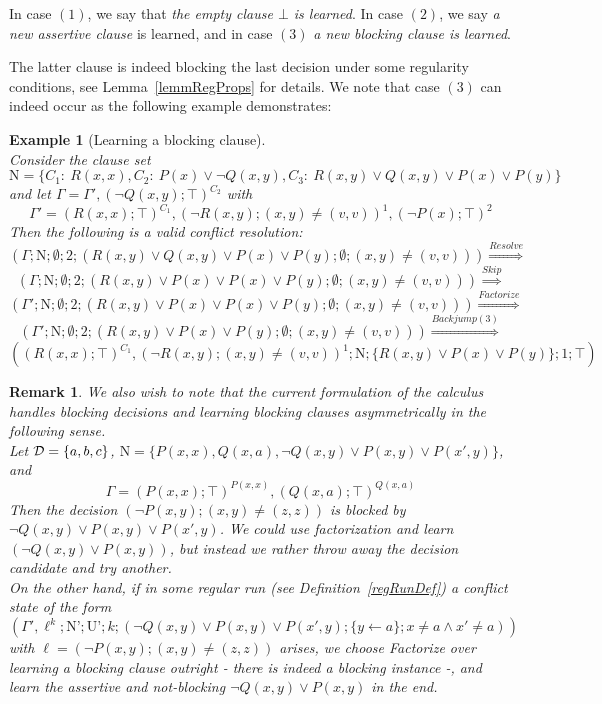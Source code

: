 \documentclass[a4paper]{article}
\newcommand{\leaveabit}{\\[6 pt]}
\newtheorem{remark}[defi]{Remark}
\newtheorem{example}[defi]{Example}
\newcommand\exClauseNo[1]{C_{#1}} \newcommand{\rst}[1]{|_{#1}}
\begin{document}
In case $(1)$, we say that \emph{the empty clause $\bot$ is learned}. 
In case $(2)$, we say \emph{a new assertive clause} is learned, and in case $(3)$ \emph{a new blocking clause is learned}.

The latter clause is indeed blocking the last decision under some regularity conditions, see Lemma~\ref{lemmRegProps} for details.
We note that case $(3)$ can indeed occur as the following example demonstrates:

\begin{example}[Learning a blocking clause]\emph{~}\leaveabit
\noindent
Consider the clause set
\[\text{N} = \{ 
		\exClauseNo{1}:~R(x,x), 
		\exClauseNo{2}:~P(x) \lor \neg Q(x,y),
		\exClauseNo{3}:~R(x,y) \lor Q(x,y) \lor P(x) \lor P(y)
\}\]
and let $\Gamma = \Gamma', (\neg Q(x,y); \top)^{\exClauseNo{2}}$ with
\[\Gamma' = (R(x,x); \top)^{\exClauseNo{1}}, (\neg R(x,y); (x,y) \ne (v,v))^1, (\neg P(x); \top)^2\]
Then the following is a valid conflict resolution:
\[
(\Gamma; \text{N}; \emptyset; 2; (R(x,y) \lor Q(x,y) \lor P(x) \lor P(y); \emptyset; (x,y) \ne (v,v)))
\stackrel{Resolve}{\Rightarrow}
\]
\[
(\Gamma; \text{N}; \emptyset; 2; (R(x,y) \lor P(x) \lor P(x) \lor P(y); \emptyset; (x,y) \ne (v,v)))
\stackrel{Skip}{\Rightarrow}
\]
\[
(\Gamma'; \text{N}; \emptyset; 2; (R(x,y) \lor P(x) \lor P(x) \lor P(y); \emptyset; (x,y) \ne (v,v)))
\stackrel{Factorize}{\Rightarrow}
\]
\[
(\Gamma'; \text{N}; \emptyset; 2; (R(x,y) \lor P(x) \lor P(y); \emptyset; (x,y) \ne (v,v)))
\stackrel{Backjump(3)}{\Rightarrow}
\]
\[
((R(x,x); \top)^{\exClauseNo{1}}, (\neg R(x,y); (x,y) \ne (v,v))^1; \text{N}; \{R(x,y) \lor P(x) \lor P(y)\}; 1; \top)
\]
\end{example}

\begin{remark} We also wish to note that the current formulation of the calculus handles 
blocking decisions and learning blocking clauses asymmetrically in the following sense.\leaveabit
Let $\mathcal{D} = \{a, b, c\}$, $\text{N} = \{P(x,x), Q(x,a), \neg Q(x,y) \lor P(x,y) \lor P(x',y) \}$, and 
\[\Gamma = (P(x,x); \top)^{P(x,x)}, (Q(x,a); \top)^{Q(x,a)}\]
Then the decision $(\neg P(x,y); (x,y) \ne (z,z))$ is blocked by $\neg Q(x,y) \lor P(x,y) \lor P(x',y)$. 
We could use factorization and learn $(\neg Q(x,y) \lor P(x,y))$, 
but instead we rather throw away the decision candidate and try another.\leaveabit
On the other hand, if in some regular run (see Definition~\ref{regRunDef}) a conflict state of the form
\[(\Gamma', \ell^{k}; \text{N'}; \text{U'}; k; (\neg Q(x,y) \lor P(x,y) \lor P(x',y); \{y \gets a\}; x \ne a \land x' \ne a))\]
with $\ell = (\neg P(x,y); (x,y) \ne (z,z))$ arises, we choose \emph{Factorize} over learning a blocking clause outright - there is indeed a blocking instance -, 
and learn the assertive and not-blocking $\neg Q(x,y) \lor P(x,y)$ in the end.
\end{remark}
% 
\end{document}
